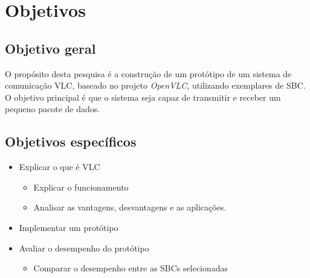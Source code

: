 \section{Objetivos} \label{obj}
\subsection{Objetivo geral}

O propósito desta pesquisa é a construção de um protótipo de um sistema de
comunicação VLC, baseado no projeto \textit{OpenVLC}, utilizando exemplares de SBC. O objetivo principal é que o sistema seja capaz de transmitir e receber um pequeno pacote de dados.

\subsection{Objetivos específicos}

\begin{itemize}

  \item Explicar o que é VLC
    \begin{itemize}
      \item Explicar o funcionamento
      \item Analisar as vantagens, desvantagens e as aplicações.
    \end{itemize}

  \item Implementar um protótipo
  \item Avaliar o desempenho do protótipo
    \begin{itemize}
      \item Comparar o desempenho entre as SBCs selecionadas
    \end{itemize}

\end{itemize}

